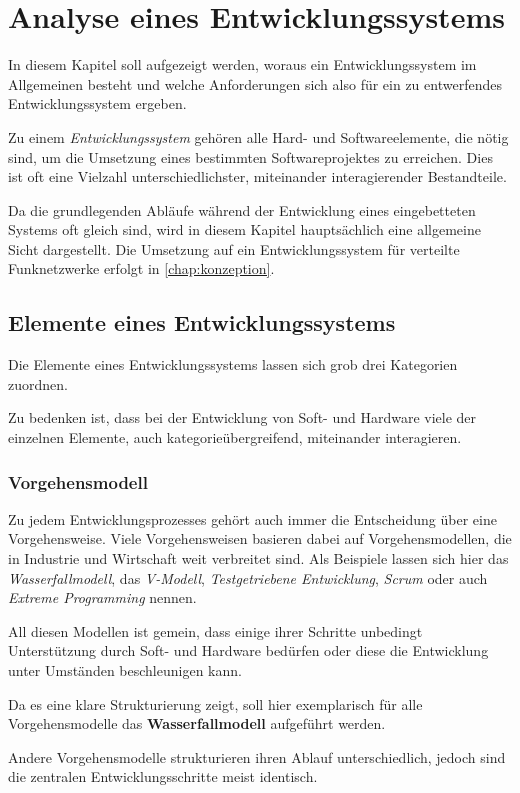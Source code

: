 \chapter{Analyse eines Entwicklungssystems}\label{chap:analyse}
\minitoc
In diesem Kapitel soll aufgezeigt werden, woraus ein Entwicklungssystem
im Allgemeinen besteht und welche Anforderungen sich also für ein zu
entwerfendes Entwicklungssystem ergeben.
\begin{definition}[Entwicklungssystem]
Zu einem \emph{Entwicklungssystem} gehören
alle Hard- und Softwareelemente, die nötig sind, um die Umsetzung eines
bestimmten Softwareprojektes zu erreichen. Dies ist oft eine Vielzahl
unterschiedlichster, miteinander interagierender Bestandteile.
\end{definition}
Da die grundlegenden Abläufe während der Entwicklung eines eingebetteten
Systems oft gleich sind, wird in diesem Kapitel hauptsächlich eine allgemeine
Sicht dargestellt. Die Umsetzung auf ein Entwicklungssystem für verteilte
Funknetzwerke erfolgt in \autoref{chap:konzeption}.
\clearpage
\section{Elemente eines Entwicklungssystems}
Die Elemente eines Entwicklungssystems lassen sich grob drei Kategorien
zuordnen. 

Zu bedenken ist, dass bei der Entwicklung von Soft- und Hardware viele der
einzelnen Elemente, auch kategorieübergreifend, miteinander interagieren. 
\subsection{Vorgehensmodell}
Zu jedem Entwicklungsprozesses gehört auch immer die Entscheidung über eine
Vorgehensweise. Viele Vorgehensweisen basieren dabei auf Vorgehensmodellen,
die in Industrie und Wirtschaft weit verbreitet sind. Als Beispiele lassen sich
hier das \emph{Wasserfallmodell}, das \emph{V-Modell},
\emph{Testgetriebene Entwicklung}, \emph{Scrum} oder auch \emph{Extreme
Programming} nennen.

All diesen Modellen ist gemein, dass einige ihrer Schritte
unbedingt Unterstützung durch Soft- und Hardware bedürfen oder
diese die Entwicklung unter Umständen beschleunigen kann.

Da es eine klare Strukturierung zeigt, soll hier exemplarisch für alle
Vorgehensmodelle das \textbf{Wasserfallmodell} aufgeführt werden.

Andere Vorgehensmodelle strukturieren ihren Ablauf unterschiedlich, jedoch sind
die zentralen Entwicklungsschritte meist identisch.

